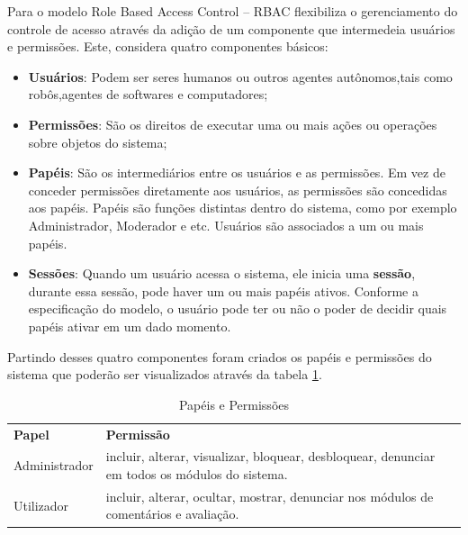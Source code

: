 \documentclass[12pt, a4paper]{report}
\begin{document}
Para \citep{sandhu1997} o modelo Role Based Access Control – RBAC flexibiliza o gerenciamento do controle de acesso através da adição de um componente que intermedeia usuários e permissões. Este, considera quatro componentes básicos:
\begin{itemize}
\item \textbf{Usuários}: Podem ser seres humanos ou outros agentes autônomos,tais como robôs,agentes de softwares e computadores;
\item \textbf{Permissões}: São os direitos de executar uma ou mais ações ou operações sobre objetos do sistema;
\item \textbf{Papéis}: São os intermediários entre os usuários e as permissões. Em vez de conceder permissões diretamente aos usuários, as permissões são concedidas aos papéis. Papéis são funções distintas dentro do sistema, como por exemplo Administrador, Moderador e etc. Usuários são associados a um ou mais papéis.  
\item \textbf{Sessões}: Quando um usuário acessa o sistema, ele inicia uma \textbf{sessão}, durante  essa  sessão, pode haver  um  ou  mais  papéis ativos. Conforme a especificação do modelo, o usuário pode ter ou não o poder de decidir quais papéis ativar em um dado momento.
\end{itemize}

Partindo desses quatro componentes foram criados os papéis e permissões do sistema que poderão ser visualizados através da tabela \ref{tab:papelperm}.

\begin{table}
 \centering
 {\renewcommand\arraystretch{1.25}
 \begin{tabular}{ l l }
  \cline{1-1}\cline{2-2}  
    \multicolumn{1}{|p{3.850cm}|}{\textbf{Papel} \centering } &
    \multicolumn{1}{p{4.217cm}|}{\textbf{Permissão} \centering }
  \\  
  \cline{1-1}\cline{2-2}  
    \multicolumn{1}{|p{3.850cm}|}{Administrador} &
    \multicolumn{1}{p{4.217cm}|}{incluir, alterar, visualizar, bloquear, desbloquear, denunciar em todos os módulos do sistema.}
  \\  
  \cline{1-1}\cline{2-2}  
    \multicolumn{1}{|p{3.850cm}|}{Utilizador} &
    \multicolumn{1}{p{4.217cm}|}{incluir, alterar, ocultar, mostrar, denunciar nos módulos de comentários e avaliação.}
  \\  
  \hline
 \end{tabular} }
 \caption{Papéis e Permissões}
  \label{tab:papelperm}
\end{table}
\end{document}
